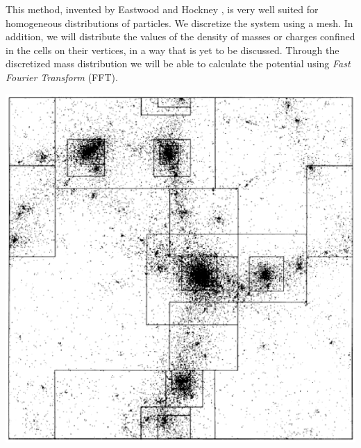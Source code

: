 \vspace{0.1cm}
\noindent
\begin{minipage}{\textwidth}
\begin{minipage}{.58\textwidth}
This method, invented by Eastwood and Hockney \citep{hockney,hockney_book}, is very well suited for homogeneous distributions of particles. We discretize the system using a mesh. In addition, we will distribute the values of the density of masses or charges confined in the cells on their vertices, in a way that is yet to be discussed. Through the discretized mass distribution we will be able to calculate the potential using \emph{Fast Fourier Transform} (FFT).
 \end{minipage}\hfill
\begin{minipage}{.38\textwidth}
  \centering
  \includegraphics[width=\textwidth]{pics/particle_mesh}
  \label{fig:particle_mesh}
\end{minipage}
\end{minipage}
\vspace{0.011cm}

